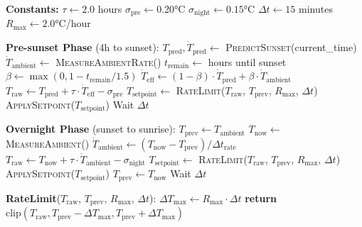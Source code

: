 \documentclass[11pt,letterpaper]{article}
\begin{document}
\begin{algorithm}[H]
\caption{Rate-Matching Thermal Control}
\label{alg:control}
\begin{algorithmic}[1]
\STATE \textbf{Constants:}
\STATE $\tau \gets 2.0$ hours 
\STATE $\sigma_\text{pre} \gets 0.20$°C 
\STATE $\sigma_\text{night} \gets 0.15$°C 
\STATE $\Delta t \gets 15$ minutes 
\STATE $R_\text{max} \gets 2.0$°C/hour 

\STATE
\STATE \textbf{Pre-sunset Phase} (4h to sunset):
    \STATE $T_\text{pred}, \dot{T}_\text{pred} \gets$ \textsc{PredictSunset}(current\_time)
    \STATE $\dot{T}_\text{ambient} \gets$ \textsc{MeasureAmbientRate}()
    \STATE $t_\text{remain} \gets$ hours until sunset
    \STATE $\beta \gets \max(0, 1 - t_\text{remain}/1.5)$ 
    \STATE $\dot{T}_\text{eff} \gets (1-\beta) \cdot \dot{T}_\text{pred} + \beta \cdot \dot{T}_\text{ambient}$
    \STATE $T_\text{raw} \gets T_\text{pred} + \tau \cdot \dot{T}_\text{eff} - \sigma_\text{pre}$
    \STATE $T_\text{setpoint} \gets$ \textsc{RateLimit}($T_\text{raw}$, $T_\text{prev}$, $R_\text{max}$, $\Delta t$)
    \STATE \textsc{ApplySetpoint}($T_\text{setpoint}$)
    \STATE Wait $\Delta t$
\ENDWHILE

\STATE
\STATE \textbf{Overnight Phase} (sunset to sunrise):
\STATE $T_\text{prev} \gets T_\text{ambient}$ 
    \STATE $T_\text{now} \gets$ \textsc{MeasureAmbient}()
    \STATE $\dot{T}_\text{ambient} \gets (T_\text{now} - T_\text{prev}) / \Delta t_\text{rate}$
    \STATE $T_\text{raw} \gets T_\text{now} + \tau \cdot \dot{T}_\text{ambient} - \sigma_\text{night}$
    \STATE $T_\text{setpoint} \gets$ \textsc{RateLimit}($T_\text{raw}$, $T_\text{prev}$, $R_\text{max}$, $\Delta t$)
    \STATE \textsc{ApplySetpoint}($T_\text{setpoint}$)
    \STATE $T_\text{prev} \gets T_\text{now}$
    \STATE Wait $\Delta t$
\ENDWHILE

\STATE
\STATE \textbf{RateLimit}($T_\text{raw}$, $T_\text{prev}$, $R_\text{max}$, $\Delta t$):
\STATE \quad $\Delta T_\text{max} \gets R_\text{max} \cdot \Delta t$
\STATE \quad \textbf{return} $\text{clip}(T_\text{raw}, T_\text{prev} - \Delta T_\text{max}, T_\text{prev} + \Delta T_\text{max})$
\end{algorithmic}
\end{algorithm}
\end{document}

